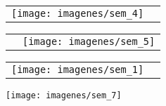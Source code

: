 \documentclass[10pt,letter]{report}
\begin{document}
\begin{table}[H]
\begin{tabular}{m{6cm}m{11cm}}
\texttt{[image: imagenes/sem\_4]}&
\begin{minipage}{10cm}


\end{minipage}
\end{tabular}
\end{table}


\begin{table}[H]
\begin{tabular}{m{11cm}m{6cm}}

\begin{minipage}{10cm}


\end{minipage}&

\texttt{[image: imagenes/sem\_5]}\\
\end{tabular}
\end{table}

\begin{table}[H]
\begin{tabular}{m{10cm}m{6cm}}
\texttt{[image: imagenes/sem\_1]}&
\begin{minipage}{5cm}


\end{minipage}
\end{tabular}
\end{table}

\texttt{[image: imagenes/sem\_7]}
\end{document}

